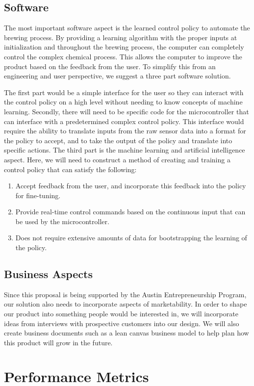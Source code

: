 \documentclass[letterpaper,10pt]{article}
\begin{document}
\subsection{Software}
The most important software aspect is the learned control policy 
to automate the brewing process. By providing a learning algorithm with the proper 
inputs at initialization and throughout the brewing process, the computer can completely 
control the complex chemical process. This allows the computer to improve the product 
based on the feedback from the user. To simplify this from an engineering and user 
perspective, we suggest a three part software solution.

The first part would be a simple interface for the user so they can 
interact with the control policy on a high level without needing to know concepts of 
machine learning. Secondly, there will need to be specific code for the microcontroller 
that can interface with a predetermined complex control policy. This interface would 
require the ability to translate inputs from the raw sensor data into a format for 
the policy to accept, and to take the  output of the policy and translate into specific 
actions. The third part is the machine learning and artificial intelligence aspect.
Here, we will need to construct a method of creating and training a control policy 
that can satisfy the following:

\begin{enumerate}
	\item Accept feedback from the user, and incorporate this feedback into the 
		policy for fine-tuning.
	\item Provide real-time control commands based on the continuous input that 
		can be used by the microcontroller.
	\item Does not require extensive amounts of data for bootstrapping the learning 
		of the policy.
\end{enumerate}

\subsection{Business Aspects}
Since this proposal is being supported by the Austin Entrepreneurship Program, our 
solution also needs to incorporate aspects of marketability. In order to shape our 
product into something people would be interested in, we will incorporate ideas 
from interviews with prospective customers into our design. We will also create 
business documents such as a lean canvas business model to help plan how this product 
will grow in the future.
\section{Performance Metrics}
\end{document}
